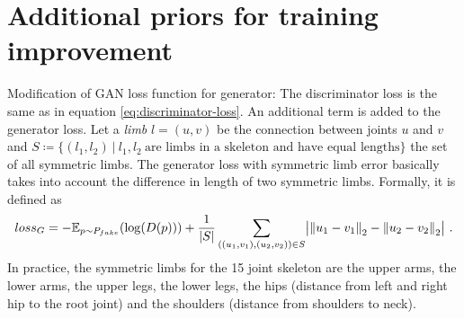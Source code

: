 \section{Additional priors for training improvement}


Modification of GAN loss function for generator:
The discriminator loss is the same as in equation \ref{eq:discriminator-loss}. 
An additional term is added to the generator loss. Let a \textit{limb} $l = (u, v)$ be the connection between joints $u$ and $v$ and $S \coloneqq \{(l_1, l_2)~|~ l_1, l_2~\text{are limbs in a skeleton and have equal lengths}\}$ the set of all symmetric limbs. 
The generator loss with symmetric limb error basically takes into account the difference in length of two symmetric limbs.
Formally, it is defined as 
\begin{equation}
	loss_G = -\mathbb{E}_{p\sim P_{fake}}(\log(D(p))) 
	+ \frac{1}{|S|}\sum_{((u_1, v_1), (u_2, v_2)) \in S} \bigl\lvert \norm{u_1 - v_1}_2 - \norm{u_2 - v_2}_2 \bigr\rvert \ .
\end{equation}
In practice, the symmetric limbs for the 15 joint skeleton are the upper arms, the lower arms, the upper legs, the lower legs, the hips (distance from left and right hip to the root joint) and the shoulders (distance from shoulders to neck).